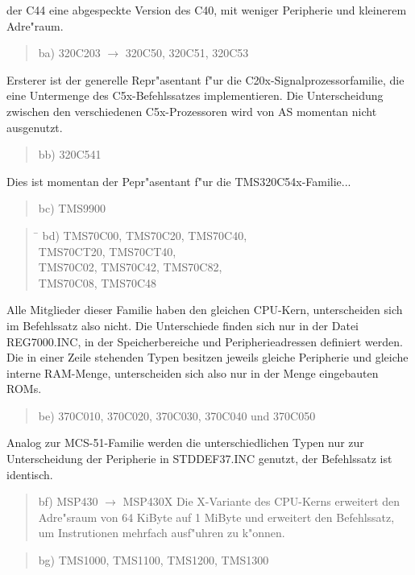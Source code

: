 \documentclass[12pt,a4paper,twoside]{report}
\begin{document}
der C44 eine abgespeckte Version des C40, mit weniger Peripherie
und kleinerem Adre"raum.
\begin{quote}
ba) 320C203 $\rightarrow$ 320C50, 320C51, 320C53
\end{quote}
Ersterer ist der generelle Repr"asentant f"ur die
C20x-Signalprozessorfamilie, die eine Untermenge des C5x-Befehlssatzes
implementieren.  Die Unterscheidung zwischen den verschiedenen
C5x-Prozessoren wird von AS momentan nicht ausgenutzt.
\begin{quote}
bb) 320C541
\end{quote}
Dies ist momentan der Pepr"asentant f"ur die TMS320C54x-Familie...
\begin{quote}
bc) TMS9900
\end{quote}
\begin{quote}
\begin{tabbing}
\hspace{0.7cm} \= \kill
bd) \> TMS70C00, TMS70C20, TMS70C40, \\
    \> TMS70CT20, TMS70CT40, \\
    \> TMS70C02, TMS70C42, TMS70C82, \\
    \> TMS70C08, TMS70C48 \\
\end{tabbing}
\end{quote}
Alle Mitglieder dieser Familie haben den gleichen CPU-Kern,
unterscheiden sich im Befehlssatz also nicht.  Die Unterschiede
finden sich nur in der Datei REG7000.INC, in der Speicherbereiche
und Peripherieadressen definiert werden.  Die in einer Zeile
stehenden  Typen besitzen jeweils gleiche Peripherie und gleiche
interne RAM-Menge, unterscheiden sich also nur in der Menge
eingebauten ROMs.
\begin{quote}
be) 370C010, 370C020, 370C030, 370C040 und 370C050
\end{quote}
Analog zur MCS-51-Familie werden die unterschiedlichen Typen nur
zur Unterscheidung der Peripherie in STDDEF37.INC genutzt, der
Befehlssatz ist identisch.
\begin{quote}
bf) MSP430 $\rightarrow$ MSP430X
Die X-Variante des CPU-Kerns erweitert den Adre"sraum von 64
KiByte auf 1 MiByte und erweitert den Befehlssatz, um
Instrutionen mehrfach ausf"uhren zu k"onnen.
\end{quote}
\begin{quote}
bg) TMS1000, TMS1100, TMS1200, TMS1300
\end{quote}
\end{document}
